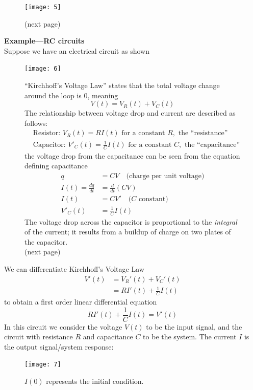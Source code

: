 \documentclass{report}
\begin{document}
\begin{figure}[h]
\begin{center}
\texttt{[image: 5]}\\
\end{center}
(next page)
\end{figure}
\newpage
\noindent\textbf{Example---RC circuits}\\
Suppose we have an electrical circuit as shown
\begin{figure}[h]
\begin{center}
\texttt{[image: 6]}\\
\end{center}
``Kirchhoff's Voltage Law'' states that the total voltage change around the loop is 0, meaning
\begin{equation*}
V(t)=V_R(t)+V_C(t)
\end{equation*}
The relationship between voltage drop and current are described as follows:
\begin{align*}
&\text{Resistor: }V_R(t)=RI(t)\text{ for a constant }R,\text{ the ``resistance''}\\
&\text{Capacitor: }V'_C(t)=\frac{1}{C}I(t)\text{ for a constant }C,\text{ the ``capacitance''}
\end{align*}
the voltage drop from the capacitance can be seen from
the equation defining capacitance
\begin{align*}
q&=CV\quad\text{(charge per unit voltage)}\\
I(t)=\frac{dq}{dt}&=\frac{d}{dt}(CV)\\
I(t)&=CV'\quad\text{($C$ constant)}\\
V'_C(t)&=\frac{1}{C}I(t)
\end{align*}
The voltage drop across the capacitor is proportional to the \textit{integral} of the current; it results from
a buildup of charge on two plates of the capacitor.\\
(next page)
\end{figure}
\newpage
\noindent We can differentiate Kirchhoff's Voltage Law 
\begin{align*}
V'(t)&=V_R'(t)+V_C'(t)\\
&=RI'(t)+\frac{1}{C}I(t)
\end{align*}
to obtain a first order linear differential equation
\begin{equation*}
RI'(t)+\frac{1}{C}I(t)=V'(t)
\end{equation*}
In this circuit we consider the voltage $V(t)$ to be the input signal, and the circuit with resistance $R$ and
capacitance $C$ to be the system. The current $I$ is the output signal/system response:
\begin{figure}[h]
\begin{center}
\texttt{[image: 7]}\\
\end{center}
$I(0)$ represents the initial condition.
\end{figure}
\newpage
\end{document}
